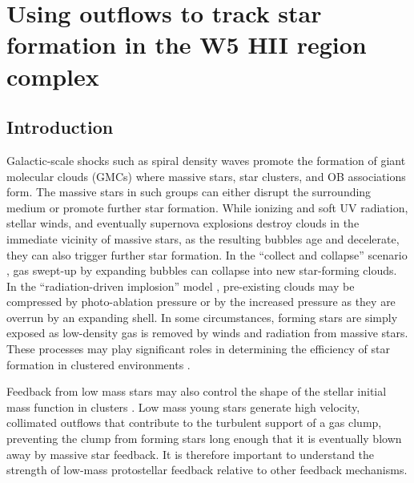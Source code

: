 
\chapter{Using outflows to track star formation in the W5 HII region complex}


\section{Introduction}


Galactic-scale shocks such as spiral density waves promote the formation of
giant molecular clouds (GMCs) where massive stars, star clusters, and OB
associations form.  The massive stars in such groups can either disrupt the
surrounding medium or promote further star formation.  While ionizing and soft
UV radiation, stellar winds, and eventually supernova explosions destroy clouds
in the immediate vicinity of massive stars, as the resulting bubbles age and
decelerate, they can also trigger further star formation.  In the ``collect and
collapse'' scenario
\citep[e.g.][]{elmegreen:sequential:1977}, gas swept-up by expanding bubbles
can collapse into new star-forming clouds.  In the ``radiation-driven
implosion'' model \citep{bertoldi:cometary:1990,klein:implosion:1983},
pre-existing clouds may be compressed by photo-ablation pressure or by the
increased pressure as they are overrun by an expanding shell.  In some
circumstances, forming stars are simply exposed as low-density gas is removed
by winds and radiation from massive stars.  These processes may play significant roles in
determining the efficiency of star formation in clustered environments
\citep{elmegreen1998}.



Feedback from low mass stars may also control the shape of the stellar initial
mass function in clusters \citep{adams1996,Peters2010}.  Low mass young stars
generate high velocity, collimated outflows that contribute to the turbulent
support of a gas clump, preventing the clump from forming stars long enough
that it is eventually blown away by massive star feedback.  It is therefore
important to understand the strength of low-mass protostellar feedback relative
to other feedback mechanisms.

